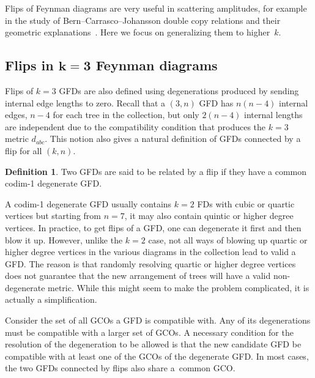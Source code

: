 \documentclass[pdftex]{sigma}
\theoremstyle{definition}
\newtheorem{defn}[thm]{Definition}
\numberwithin{equation}{section}
\begin{document}
Flips of Feynman diagrams are very useful in scattering amplitudes, for example in the study of Bern--Carrasco--Johansson double copy relations \cite{Adamo:2022dcm,Bern:2019prr, Bern:2022wqg,Bern:2008qj} and their geometric explanations~\cite{Arkani-Hamed:2017mur,Gao:2017dek,He:2021lro, He:2018pue,Herderschee:2019wtl}. Here we focus on generalizing them to higher~$k$.

\subsection[Flips in k=3 Feynman diagrams]{Flips in $\boldsymbol{k=3}$ Feynman diagrams}\label{secGFDflips}

Flips of $k=3$ GFDs are also defined using degenerations produced by sending internal edge lengths to zero. Recall that a $(3,n)$ GFD has $n(n-4)$ internal edges, $n-4$ for each tree in the collection, but only $2(n-4)$ internal lengths are independent due to the compatibility condition that produces the $k=3$ metric $d_{abc}$. This notion also gives a natural definition of GFDs connected by a flip for all $(k,n)$.

\begin{defn}
Two GFDs are said to be related by a flip if they have a common codim-1 degenerate GFD.
\end{defn}

A codim-1 degenerate GFD usually contains $k=2$ FDs with cubic or quartic vertices but starting from $n=7$, it may also contain quintic or higher degree vertices.
In practice, to get flips of a GFD, one can degenerate it first and then
blow it up.
However, unlike the $k=2$ case, not all ways of blowing up quartic
 or higher degree vertices in the various diagrams in the collection lead to valid a GFD. The reason is that randomly resolving quartic or higher degree vertices does not guarantee that the new arrangement of trees will have a valid non-degenerate metric. While this might seem to make the problem complicated, it is actually a simplification.

Consider the set of all GCOs a GFD is compatible with. Any of its degenerations must be compatible with a larger set of GCOs.
A necessary condition for the resolution of the degeneration to be allowed is that the new candidate GFD be compatible with at least one of the GCOs of the degenerate GFD. In most cases, the two GFDs connected by flips also share a~common GCO.
\end{document}
